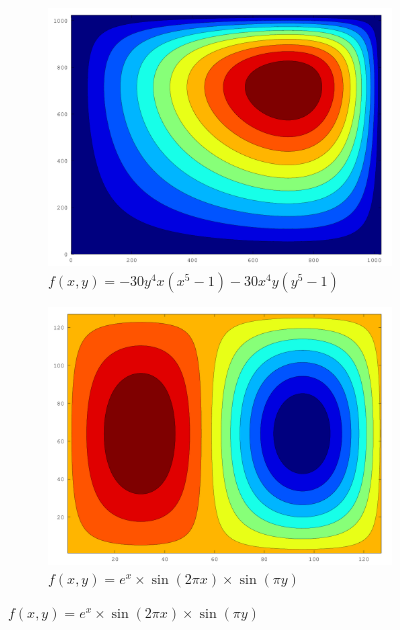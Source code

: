 \begin{figure}[htbp]
  \centering
  \begin{subfigure}[b]{0.49\textwidth}
    \includegraphics[width=\textwidth]{illustrations/orig.png}
    \caption{$f(x,y) = -30 y^4 x(x^5-1) - 30x^4 y (y^5-1)$}
    \label{fig:contour_1}
  \end{subfigure}
  \begin{subfigure}[b]{0.49\textwidth}
    \includegraphics[width=\textwidth]{illustrations/sine.png}
    \caption{$f(x,y) = e^x \times \sin{(2\pi x)} \times \sin{(\pi y)}$}
    \label{fig:contour_2}
  \end{subfigure}

  \medskip


\end{figure}
